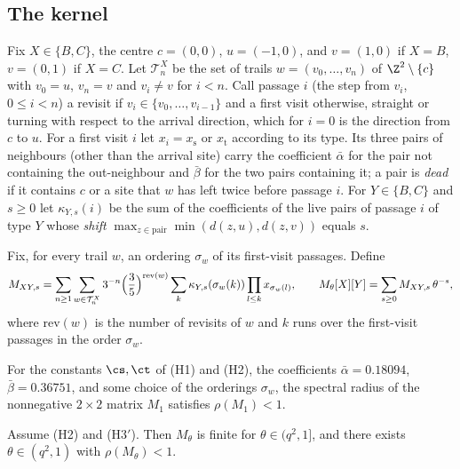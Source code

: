 \subsection{The kernel}\label{s:kernel}

Fix $X \in \{B, C\}$, the centre $c = (0, 0)$, $u = (-1, 0)$, and $v = (1, 0)$ if $X = B$, $v = (0, 1)$ if $X = C$. Let $\mathcal T^X_n$ be the set of trails $w = (v_0, \dots, v_n)$ of $\Z^2 \setminus \{c\}$ with $v_0 = u$, $v_n = v$ and $v_i \neq v$ for $i < n$. Call passage $i$ (the step from $v_i$, $0 \le i < n$) a revisit if $v_i \in \{v_0, \dots, v_{i - 1}\}$ and a first visit otherwise, straight or turning with respect to the arrival direction, which for $i = 0$ is the direction from $c$ to $u$. For a first visit $i$ let $x_i = x_{\mathrm s}$ or $x_{\mathrm t}$ according to its type. Its three pairs of neighbours (other than the arrival site) carry the coefficient $\bar\alpha$ for the pair not containing the out-neighbour and $\bar\beta$ for the two pairs containing it; a pair is \emph{dead} if it contains $c$ or a site that $w$ has left twice before passage $i$. For $Y \in \{B, C\}$ and $s \ge 0$ let $\kappa_{Y, s}(i)$ be the sum of the coefficients of the live pairs of passage $i$ of type $Y$ whose \emph{shift} $\max_{z \in \text{pair}} \min(d(z, u), d(z, v))$ equals $s$.

Fix, for every trail $w$, an ordering $\sigma_w$ of its first-visit passages. Define
\begin{equation}\label{e:kernel}
M_{XY, s} = \sum_{n \ge 1} \sum_{w \in \mathcal T^X_n} 3^{-n} \Bigl( \frac35 \Bigr)^{\mathrm{rev}(w)} \sum_{k} \kappa_{Y, s}(\sigma_w(k)) \prod_{l \le k} x_{\sigma_w(l)}, \qquad M_\theta[X][Y] = \sum_{s \ge 0} M_{XY, s} \, \theta^{-s},
\end{equation}
where $\mathrm{rev}(w)$ is the number of revisits of $w$ and $k$ runs over the first-visit passages in the order $\sigma_w$.

\begin{hypothesis}[H3$'$]\label{h:H3}
For the constants $\cs, \ct$ of (H1) and (H2), the coefficients $\bar\alpha = 0.18094$, $\bar\beta = 0.36751$, and some choice of the orderings $\sigma_w$, the spectral radius of the nonnegative $2 \times 2$ matrix $M_1$ satisfies $\rho(M_1) < 1$.
\end{hypothesis}

\begin{lemma}\label{l:Mtheta}
Assume (H2) and (H3$'$). Then $M_\theta$ is finite for $\theta \in (q^2, 1]$, and there exists $\theta \in (q^2, 1)$ with $\rho(M_\theta) < 1$.
\end{lemma}

